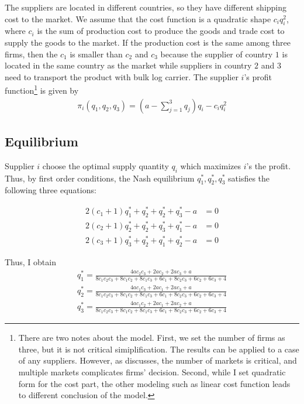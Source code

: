 \documentclass[a4paper,12pt]{article}
\begin{document}
The suppliers are located in different countries, so they have different shipping cost to the market. We assume that the cost function is a quadratic shape $c_{i} q_i ^ 2$, where $c_i$ is the sum of production cost to produce the goods and trade cost to supply the goods to the market. If the production cost is the same among three firms, then the $c_1$ is smaller than $c_2$ and $c_3$ because the supplier of country $1$ is located in the same country as the market while suppliers in country $2$ and $3$ need to transport the product with bulk log carrier. The supplier $i$'s profit function\footnote{There are two notes about the model. First, we set the number of firms as three, but it is not critical simiplification. The results can be applied to a case of any suppliers. However, as \cite{bimpikis2019cournot} discusses, the number of markets is critical, and multiple markets complicates firms' decision. Second, while I set quadratic form for the cost part, the other modeling such as linear cost function leads to different conclusion of the model.} is given by 
\begin{align}
    \pi_i (q_1, q_2, q_3) = \left( a - \sum_{j=1}^3 q_{j} \right) q_{i} - c_{i} q_i ^ 2 
\end{align}

\subsection{Equilibrium}
Supplier $i$ choose the optimal supply quantity $q_i$ which maximizes $i$'s the profit. Thus, by first order conditions, the Nash equilibrium $q_1^*, q_2^*, q_3^*$ satisfies the following three equations:

\begin{align}
    2(c_1 + 1) q_1^* + q_2 ^* + q_2 ^ * + q_3 ^ * - a &= 0 \\
    2(c_2 + 1) q_2^* + q_2 ^* + q_3 ^ * + q_1 ^ * - a &= 0 \\
    2(c_3 + 1) q_3^* + q_2 ^* + q_1 ^ * + q_2 ^ * - a &= 0
\end{align}

Thus, I obtain 
\begin{align}
    q_1^* = \frac{4 a c_{2} c_{3} + 2 a c_{2} + 2 a c_{3} + a}{8 c_{1} c_{2} c_{3} + 8 c_{1} c_{2} + 8 c_{1} c_{3} + 6 c_{1} + 8 c_{2} c_{3} + 6 c_{2} + 6 c_{3} + 4} \\
    q_2^* = \frac{4 a c_{1} c_{3} + 2 a c_{1} + 2 a c_{3} + a}{8 c_{1} c_{2} c_{3} + 8 c_{1} c_{2} + 8 c_{1} c_{3} + 6 c_{1} + 8 c_{2} c_{3} + 6 c_{2} + 6 c_{3} + 4} \\
    q_3^* = \frac{4 a c_{1} c_{2} + 2 a c_{1} + 2 a c_{2} + a}{8 c_{1} c_{2} c_{3} + 8 c_{1} c_{2} + 8 c_{1} c_{3} + 6 c_{1} + 8 c_{2} c_{3} + 6 c_{2} + 6 c_{3} + 4}
\end{align}
\end{document}
